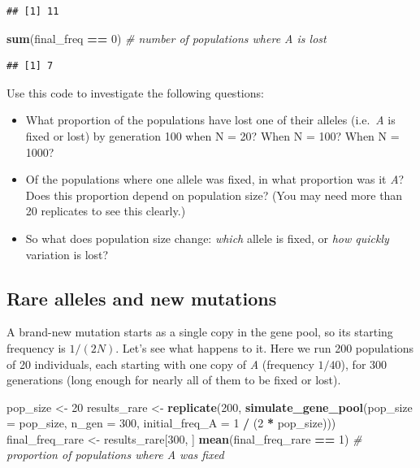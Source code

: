 \documentclass[
  a4paper]{book}
\newenvironment{Shaded}{\begin{snugshade}}{\end{snugshade}}
\newcommand{\AttributeTok}[1]{\textcolor[rgb]{0.13,0.29,0.53}{#1}}
\newcommand{\CommentTok}[1]{\textcolor[rgb]{0.56,0.35,0.01}{\textit{#1}}}
\newcommand{\DecValTok}[1]{\textcolor[rgb]{0.00,0.00,0.81}{#1}}
\newcommand{\FunctionTok}[1]{\textcolor[rgb]{0.13,0.29,0.53}{\textbf{#1}}}
\newcommand{\NormalTok}[1]{#1}
\newcommand{\OtherTok}[1]{\textcolor[rgb]{0.56,0.35,0.01}{#1}}
\newcommand{\SpecialCharTok}[1]{\textcolor[rgb]{0.81,0.36,0.00}{\textbf{#1}}}
\providecommand{\tightlist}{%
  \setlength{\itemsep}{0pt}\setlength{\parskip}{0pt}}
\begin{document}
\begin{verbatim}
## [1] 11
\end{verbatim}

\begin{Shaded}
\begin{Highlighting}[]
\FunctionTok{sum}\NormalTok{(final\_freq }\SpecialCharTok{==} \DecValTok{0}\NormalTok{)   }\CommentTok{\# number of populations where A is lost}
\end{Highlighting}
\end{Shaded}

\begin{verbatim}
## [1] 7
\end{verbatim}

Use this code to investigate the following questions:

\begin{itemize}
\tightlist
\item
  What proportion of the populations have lost one of their alleles (i.e.~\emph{A} is fixed or lost) by generation 100 when N = 20? When N = 100? When N = 1000?
\item
  Of the populations where one allele was fixed, in what proportion was it \emph{A}? Does this proportion depend on population size? (You may need more than 20 replicates to see this clearly.)
\item
  So what does population size change: \emph{which} allele is fixed, or \emph{how quickly} variation is lost?
\end{itemize}

\subsection{Rare alleles and new mutations}\label{rare-alleles-and-new-mutations}

A brand-new mutation starts as a single copy in the gene pool, so its starting frequency is \(1/(2N)\). Let's see what happens to it. Here we run 200 populations of 20 individuals, each starting with one copy of \emph{A} (frequency \(1/40\)), for 300 generations (long enough for nearly all of them to be fixed or lost).

\begin{Shaded}
\begin{Highlighting}[]
\NormalTok{pop\_size }\OtherTok{\textless{}{-}} \DecValTok{20}
\NormalTok{results\_rare }\OtherTok{\textless{}{-}} \FunctionTok{replicate}\NormalTok{(}\DecValTok{200}\NormalTok{, }\FunctionTok{simulate\_gene\_pool}\NormalTok{(}\AttributeTok{pop\_size =}\NormalTok{ pop\_size, }\AttributeTok{n\_gen =} \DecValTok{300}\NormalTok{,}
                                                  \AttributeTok{initial\_freq\_A =} \DecValTok{1} \SpecialCharTok{/}\NormalTok{ (}\DecValTok{2} \SpecialCharTok{*}\NormalTok{ pop\_size)))}
\NormalTok{final\_freq\_rare }\OtherTok{\textless{}{-}}\NormalTok{ results\_rare[}\DecValTok{300}\NormalTok{, ]}
\FunctionTok{mean}\NormalTok{(final\_freq\_rare }\SpecialCharTok{==} \DecValTok{1}\NormalTok{)   }\CommentTok{\# proportion of populations where A was fixed}
\end{Highlighting}
\end{Shaded}
\end{document}
